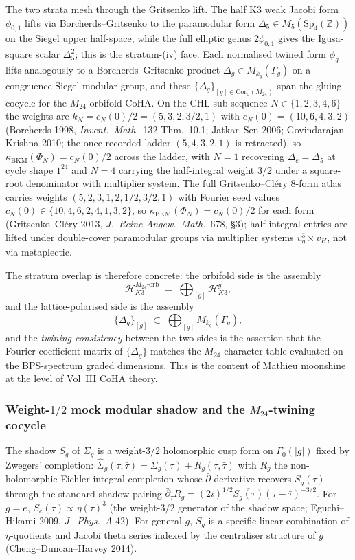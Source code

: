 The two strata mesh through the Gritsenko lift. The half K3 weak Jacobi
form $\phi_{0,1}$ lifts via Borcherds--Gritsenko to the paramodular form
$\Delta_5 \in M_5(\mathrm{Sp}_4(\mathbb{Z}))$ on the Siegel upper
half-space, while the full elliptic genus $2\phi_{0,1}$ gives the
Igusa-square scalar $\Delta_5^2$; this is the stratum-(iv) face. Each
normalised twined form $\phi_g$ lifts analogously to a
Borcherds--Gritsenko product $\Delta_g \in M_{k_g}(\Gamma_g)$ on a
congruence Siegel modular group, and these $\{\Delta_g\}_{[g] \in
\mathrm{Conj}(M_{24})}$ span the gluing cocycle for the $M_{24}$-orbifold
CoHA. On the CHL sub-sequence $N \in \{1, 2, 3, 4, 6\}$ the weights are
$k_N = c_N(0)/2 = (5, 3, 2, 3/2, 1)$ with $c_N(0) = (10, 6, 4, 3, 2)$
(Borcherds 1998, \emph{Invent.\ Math.}\ 132 Thm.~10.1; Jatkar--Sen 2006;
Govindarajan--Krishna 2010; the once-recorded ladder $(5, 4, 3, 2, 1)$ is
retracted), so $\kappa_{\mathrm{BKM}}(\Phi_N) = c_N(0)/2$
across the ladder, with $N = 1$ recovering $\Delta_e = \Delta_5$ at
cycle shape $1^{24}$ and $N = 4$ carrying the half-integral weight $3/2$
under a square-root denominator with multiplier system. The full Gritsenko--Cl\'ery 8-form atlas carries
weights $(5, 2, 3, 1, 2, 1/2, 3/2, 1)$ with Fourier seed values
$c_N(0) \in \{10, 4, 6, 2, 4, 1, 3, 2\}$, so $\kappa_{\mathrm{BKM}}(\Phi_N) =
c_N(0)/2$ for each form (Gritsenko--Cl\'ery 2013, \emph{J.\ Reine Angew.\
Math.}\ 678, \S 3); half-integral entries are lifted under double-cover
paramodular groups via multiplier systems $v_\eta^3 \times v_H$, not via
metaplectic.

The stratum overlap is therefore concrete: the orbifold side is the assembly
\[
\mathcal{H}_{K3}^{M_{24}\text{-orb}} \;=\; \bigoplus_{[g]} \mathcal{H}_{K3}^g,
\]
and the lattice-polarised side is the assembly
\[
\{\Delta_g\}_{[g]} \;\subset\; \bigoplus_{[g]} M_{k_g}(\Gamma_g),
\]
and the \emph{twining consistency} between the two sides is the assertion that the Fourier-coefficient matrix of $\{\Delta_g\}$ matches the $M_{24}$-character table evaluated on the BPS-spectrum graded dimensions. This is the content of Mathieu moonshine at the level of Vol~III CoHA theory.

\subsubsection{Weight-\texorpdfstring{$1/2$}{1/2} mock modular shadow and the $M_{24}$-twining cocycle}
\label{subsec:mock-shadow-twining}

The shadow $S_g$ of $\Sigma_g$ is a weight-$3/2$ holomorphic cusp form on $\Gamma_0(|g|)$ fixed by Zwegers' completion: $\widehat\Sigma_g(\tau, \bar\tau) = \Sigma_g(\tau) + R_g(\tau, \bar\tau)$ with $R_g$ the non-holomorphic Eichler-integral completion whose $\bar\partial$-derivative recovers $S_g(\tau)$ through the standard shadow-pairing $\bar\partial_{\bar\tau} R_g = (2i)^{1/2} \overline{S_g(\tau)} (\tau - \bar\tau)^{-3/2}$. For $g = e$, $S_e(\tau) \propto \eta(\tau)^3$ (the weight-$3/2$ generator of the shadow space; Eguchi--Hikami 2009, \emph{J.\ Phys.\ A} 42). For general $g$, $S_g$ is a specific linear combination of $\eta$-quotients and Jacobi theta series indexed by the centraliser structure of $g$ (Cheng--Duncan--Harvey 2014).

